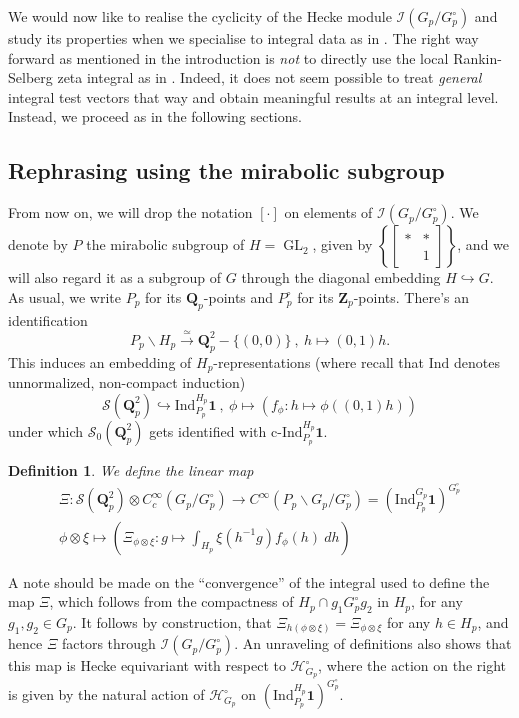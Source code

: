 \documentclass{amsart}%
\theoremstyle{plain}
\theoremstyle{plain}
\newtheorem{defn}[thm]{Definition}
\theoremstyle{remark}
\DeclareMathOperator{\GL}{GL}
\begin{document}
    We would now like to realise the cyclicity of the Hecke module $\mathcal{I}(G_p/G_p^\circ)$ and study its properties when we specialise to integral data as in . The right way forward as mentioned in the introduction is \textit{not} to directly use the local Rankin-Selberg zeta integral as in \cite{Loeffler_2021}. Indeed, it does not seem possible to treat \textit{general} integral test vectors that way and obtain meaningful results at an integral level. Instead, we proceed as in the following sections.

\subsection{Rephrasing using the mirabolic subgroup}\label{sec from and back}

From now on, we will drop the notation $[\cdot]$ on elements of $\mathcal{I}(G_p/G_p^\circ)$. We denote by $P$ the mirabolic subgroup of $H=\GL_2$, given by $\left\{\left[\begin{smallmatrix}
    * & * \\
    & 1
\end{smallmatrix}\right]\right\}$, and we will also regard it as a subgroup of $G$ through the diagonal embedding $H\hookrightarrow G$. As usual, we write $P_p$ for its $\mathbf{Q}_p$-points and 
$P_p^\circ$ for its $\mathbf{Z}_p$-points. There's an identification
$$P_p \backslash H_p\overset{\simeq}{\longrightarrow} \mathbf{Q}_p^2-\{(0,0)\}\ ,\ h\mapsto (0,1)h.$$
This induces an embedding of $H_p$-representations (where recall that $\mathrm{Ind}$ denotes unnormalized, non-compact induction)
$$\mathcal{S}(\mathbf{Q}_p^2)\hookrightarrow \mathrm{Ind}_{P_p}^{H_p}\mathbf{1}\ ,\ \phi\mapsto \left(f_\phi: h\mapsto \phi((0,1)h)\right)$$
under which $\mathcal{S}_0(\mathbf{Q}_p^2)$ gets identified with $\mathrm{c}\text{-}\mathrm{Ind}_{P_p}^{H_p}\mathbf1$. 
\begin{defn}We define the linear map
\begin{align*}\Xi:\mathcal{S}(\mathbf{Q}_p^2)\otimes C_c^\infty(G_p/G_p^\circ)\longrightarrow C^\infty(P_p\backslash G_p/G_p^\circ)=\left(\mathrm{Ind}_{P_p}^{G_p}\mathbf{1}\right)^{G_p^\circ}\\
\phi\otimes \xi\mapsto \left(\Xi_{\phi\otimes \xi}:g\mapsto\int_{H_p}\xi(h^{-1}g)f_\phi(h)\ dh\right)\end{align*}
\end{defn}
\noindent A note should be made on the ``convergence'' of the integral used to define the map $\Xi$, which follows from the compactness of $H_p\cap g_1 G_p^\circ g_2$ in $H_p$, for any $g_1,g_2\in G_p$.
It follows by construction, that $\Xi_{h(\phi\otimes \xi)}=\Xi_{\phi\otimes \xi}$ for any $h\in H_p$, and hence $\Xi$ factors through $\mathcal{I}(G_p/G_p^\circ)$. An unraveling of definitions also shows that this map is Hecke equivariant with respect to $\mathcal{H}_{G_p}^\circ$, where the action on the right is given by the natural action of $\mathcal{H}_{G_p}^\circ$ on $(\mathrm{Ind}_{P_p}^{H_p}\mathbf{1})^{G_p^\circ}$. 
\end{document}
